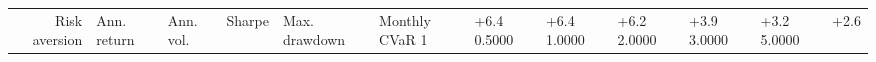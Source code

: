 \begin{tabular}{rlllllll}
\toprule
Risk aversion & Ann. return & Ann. vol. & Sharpe & Max. drawdown & Monthly CVaR 1%
 & +6.4%
0.5000 & +6.4%
1.0000 & +6.2%
2.0000 & +3.9%
3.0000 & +3.2%
5.0000 & +2.6%
\bottomrule
\end{tabular}
